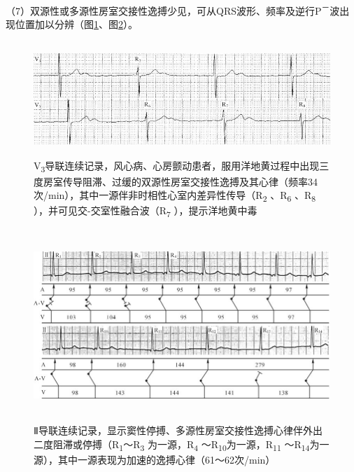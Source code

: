 （7）双源性或多源性房室交接性逸搏少见，可从QRS波形、频率及逆行P\textsuperscript{－}波出现位置加以分辨（图\ref{fig12-7}、图\ref{fig12-8}）。

\begin{figure}[!htbp]
 \centering
 \includegraphics[width=5.58333in,height=1.70833in]{./images/Image00200.jpg}
 \captionsetup{justification=centering}
 \caption{V\textsubscript{3}导联连续记录，风心病、心房颤动患者，服用洋地黄过程中出现三度房室传导阻滞、过缓的双源性房室交接性逸搏及其心律（频率34次/min），其中一源伴非时相性心室内差异性传导（R\textsubscript{2} 、R\textsubscript{6} 、R\textsubscript{8} ），并可见交-交室性融合波（R\textsubscript{7} ），提示洋地黄中毒}
 \label{fig12-7}
  \end{figure} 


\begin{figure}[!htbp]
 \centering
 \includegraphics[width=5.76042in,height=2.84375in]{./images/Image00201.jpg}
 \captionsetup{justification=centering}
 \caption{Ⅱ导联连续记录，显示窦性停搏、多源性房室交接性逸搏心律伴外出二度阻滞或停搏（R\textsubscript{1}～R\textsubscript{3} 为一源，R\textsubscript{4} ～R\textsubscript{10}为一源，R\textsubscript{11} ～R\textsubscript{14}为一源），其中一源表现为加速的逸搏心律（61～62次/min）}
 \label{fig12-8}
  \end{figure} 



\protect\hypertarget{text00019.htmlux5cux23subid183}{}{}

